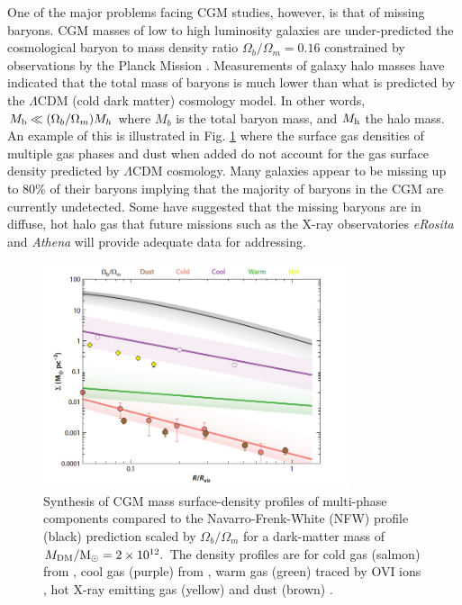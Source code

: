 \documentclass[10pt,a4paper]{article}
\begin{document}
One of the major problems facing CGM studies, however, is that of missing baryons. CGM masses of low to high luminosity galaxies are under-predicted the cosmological baryon to mass density ratio $\Omega_b/\Omega_m=0.16$ constrained by observations by the Planck Mission \citet{Planck2016}. Measurements of galaxy halo masses have indicated that the total mass of baryons is much lower than what is predicted by the $\Lambda$CDM (cold dark matter) cosmology model. In other words, $M_{\rm b} \ll (\Omega_b/\Omega_m)M_h$ where $M_b$ is the total baryon mass, and $M_{\rm h}$ the halo mass. An example of this is illustrated in Fig. \ref{fig:CGM-baryon-budget-Tumlinson2017} where the surface gas densities of multiple gas phases and dust when added do not account for the gas surface density predicted by $\Lambda$CDM cosmology. Many galaxies appear to be missing up to $80\%$ of their baryons implying that the majority of baryons in the CGM are currently undetected. Some have suggested that the missing baryons are in diffuse, hot halo gas that future missions such as the X-ray observatories {\it eRosita} and {\it Athena} \citep{Barret2016} will provide adequate data for addressing. 

\begin{figure}
 \centering
 \includegraphics[width=0.8\textwidth]{plots_chp1/CGM_missing_baryons_Tumlinson_2017}
 \caption[CGM mass surface-density profiles of multi-phase components]{Synthesis of CGM mass surface-density profiles of multi-phase components compared to the Navarro-Frenk-White (NFW) profile (black) prediction scaled by $\Omega_b/\Omega_m$ for a dark-matter mass of $M_{\rm DM}/\rm{M}_\odot = 2\times10^{12}.$ The density profiles are for cold gas (salmon) from \citet{ZhuMenard2013a}, cool gas (purple) from \citet{Werk2014}, warm gas (green) traced by OVI ions \citep{Tumlinson2011,Peeples2014}, hot X-ray emitting gas (yellow) \citep{Anderson2016} and dust (brown) \citep{Menard2010}. }
 \label{fig:CGM-baryon-budget-Tumlinson2017}
\end{figure}
\end{document}
